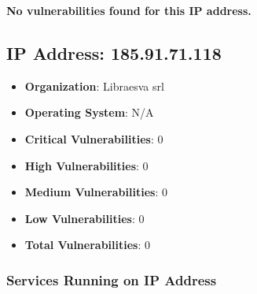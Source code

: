 \documentclass{article}
\begin{document}
\textbf{No vulnerabilities found for this IP address.}




\clearpage



\subsection{IP Address: 185.91.71.118}

\begin{itemize}
    \item \textbf{Organization}: Libraesva srl
    \item \textbf{Operating System}:  N/A 
    \item \textbf{Critical Vulnerabilities}: 0
    \item \textbf{High Vulnerabilities}: 0
    \item \textbf{Medium Vulnerabilities}: 0
    \item \textbf{Low Vulnerabilities}: 0
    \item \textbf{Total Vulnerabilities}: 0
\end{itemize}

\subsubsection*{Services Running on IP Address}
\end{document}
